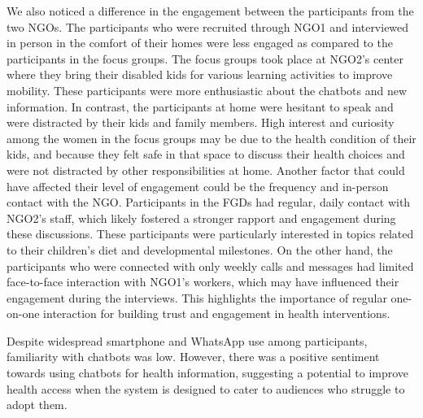 We also noticed a difference in the engagement between the participants from the two NGOs. The participants who were recruited through NGO1 and interviewed in person in the comfort of their homes were less engaged as compared to the participants in the focus groups. The focus groups took place at NGO2's center where they bring their disabled kids for various learning activities to improve mobility. These participants were more enthusiastic about the chatbots and new information. In contrast, the participants at home were hesitant to speak and were distracted by their kids and family members. High interest and curiosity among the women in the focus groups may be due to the health condition of their kids, and because they felt safe in that space to discuss their health choices and were not distracted by other responsibilities at home.
Another factor that could have affected their level of engagement could be the frequency and in-person contact with the NGO. Participants in the FGDs had regular, daily contact with NGO2's staff, which likely fostered a stronger rapport and engagement during these discussions. These participants were particularly interested in topics related to their children's diet and developmental milestones. On the other hand, the participants who were connected with only weekly calls and messages had limited face-to-face interaction with NGO1's workers, which may have influenced their engagement during the interviews. This highlights the importance of regular one-on-one interaction for building trust and engagement in health interventions.

Despite widespread smartphone and WhatsApp use among participants, familiarity with chatbots was low. However, there was a positive sentiment towards using chatbots for health information, suggesting a potential to improve health access when the system is designed to cater to audiences who struggle to adopt them. 








